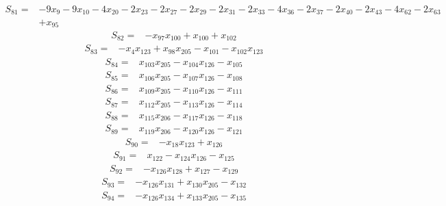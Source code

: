 \begin{align*}
S_{81}={}&-9x_{9}-9x_{10}-4x_{20}-2x_{23}-2x_{27}-2x_{29}-2x_{31}-2x_{33}-4x_{36}-2x_{37}-2x_{40}-2x_{43}-4x_{62}-2x_{63}\\
{}&+x_{95}
\end{align*}
\begin{align*}
S_{82}={}&-x_{97}x_{100}+x_{100}+x_{102}
\end{align*}
\begin{align*}
S_{83}={}&-x_{4}x_{123}+x_{98}x_{205}-x_{101}-x_{102}x_{123}
\end{align*}
\begin{align*}
S_{84}={}&x_{103}x_{205}-x_{104}x_{126}-x_{105}
\end{align*}
\begin{align*}
S_{85}={}&x_{106}x_{205}-x_{107}x_{126}-x_{108}
\end{align*}
\begin{align*}
S_{86}={}&x_{109}x_{205}-x_{110}x_{126}-x_{111}
\end{align*}
\begin{align*}
S_{87}={}&x_{112}x_{205}-x_{113}x_{126}-x_{114}
\end{align*}
\begin{align*}
S_{88}={}&x_{115}x_{206}-x_{117}x_{126}-x_{118}
\end{align*}
\begin{align*}
S_{89}={}&x_{119}x_{206}-x_{120}x_{126}-x_{121}
\end{align*}
\begin{align*}
S_{90}={}&-x_{18}x_{123}+x_{126}
\end{align*}
\begin{align*}
S_{91}={}&x_{122}-x_{124}x_{126}-x_{125}
\end{align*}
\begin{align*}
S_{92}={}&-x_{126}x_{128}+x_{127}-x_{129}
\end{align*}
\begin{align*}
S_{93}={}&-x_{126}x_{131}+x_{130}x_{205}-x_{132}
\end{align*}
\begin{align*}
S_{94}={}&-x_{126}x_{134}+x_{133}x_{205}-x_{135}
\end{align*}
